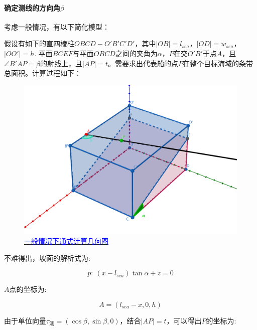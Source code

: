 

\paragraph{确定测线的方向角$\beta$}

考虑一般情况，有以下简化模型：

假设有如下的直四棱柱$OBCD - O'B'C'D'$，其中$|OB| = l_{sea}$，$|OD| = w_{sea}$，$|OO'| = h$. 平面$BCEF$与平面$OBCD$之间的夹角为$\alpha$，$P$在交$O'B'$于点$A$，且$\angle B'AP = \beta$的射线上，且$|AP| = t$。需要求出代表船的点$P$在整个目标海域的条带总面积。计算过程如下：

\begin{figure}[h]
    \centering
    \includegraphics[scale=0.3]{res/img/一般情况下通式计算几何图.png}
    \caption{\href{https://www.geogebra.org/m/jzwhwcqr}{\textcolor{blue}{一般情况下通式计算几何图}}}
    \label{fig:一般情况下通式计算几何图}
\end{figure}

不难得出，坡面的解析式为:

\begin{equation}
    p: \ 
    (x - l_{sea})\tan \alpha + z = 0
\end{equation}

$A$点的坐标为:

\begin{equation}
    A = (l_{sea} - x, 0, h)
\end{equation}

由于单位向量$\tau_\text{测} = (\cos \beta, \sin \beta, 0)$，结合$|AP| = t$，可以得出$P$的坐标为:

